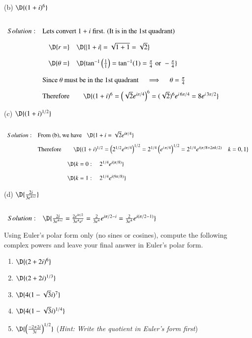 \documentclass[11pt]{article}
\begin{document}
(b) $\D{(1+i)^6}$ 

$
\setlength{\extrarowheight}{0.4cm}
\begin{array}{rrl}
	Solution: & \multicolumn{2}{l}{\text{Lets convert $1+i$ first. (It is in the 1st quadrant)}} \\
	& \D{r =} & \D{\left|1+i\right| = \sqrt{1+1} = \sqrt{2} } \\
	& \D{\theta =} & \D{\tan^{-1}\left(\frac{1}{1}\right) = \tan^{-1}(1) = \frac{\pi}{4} \,\,\text{or}\,\, -\frac{\pi}{4} } \\
	& \multicolumn{2}{l}{\text{Since $\theta$ must be in the 1st quadrant $\quad \implies \quad \theta = \frac{\pi}{4}$ }} \\
	& \text{Therefore} & \quad \D{(1+i)^6 = \left(\sqrt{2}e^{i\pi/4}\right)^6 = (\sqrt{2})^6e^{i\,6\pi/4}= 8e^{i\,3\pi/2}} \\
\end{array}
$

(c) $\D{(1+i)^{1/2}}$ 

$
\setlength{\extrarowheight}{0.4cm}
\begin{array}{rrl}
	Solution: & \multicolumn{2}{l}{\text{From (b), we have \,\, }\D{ 1+i = \sqrt{2}e^{i\pi/4} }} \\
	& \text{Therefore} & \quad \D{(1+i)^{1/2} = \left(2^{1/2}e^{i\pi/4}\right)^{1/2} = 2^{1/4}\left(e^{i\,\pi/4}\right)^{1/2} = 2^{1/4} e^{i(\pi/8+2\pi k/2)} \quad k=0,1} \\
	&& \D{k=0: \quad 2^{1/4}e^{i(\pi/8)}} \\
	&& \D{k=1: \quad 2^{1/4}e^{i(9\pi/8)}} \\
\end{array}
$

(d) $\D{\frac{2i}{3e^{4+i}}}$ 

$
\setlength{\extrarowheight}{0.4cm}
\begin{array}{rrl}
	Solution: & \D{\frac{2i}{3e^{4+i}} = \frac{2e^{i\pi/2}}{3e^4e^{i}} = \frac{2}{3e^4}e^{i\pi/2-i} = \frac{2}{3e^4}e^{i(\pi/2-1)}} \\
\end{array}
$

\newpage
\thispagestyle{empty}


\vspace{0.2cm}

Using Euler's polar form only (no sines or cosines), compute the following complex powers and leave your final answer in Euler's polar form.
\begin{enumerate}
	\item $\D{(2+2i)^6}$
	\item $\D{(2+2i)^{1/3}}$
	\item $\D{4(1-\sqrt{3}i)^7}$
	\item $\D{4(1-\sqrt{3}i)^{1/4}}$
	\item $\D{\left(\frac{-2+2i}{3i}\right)^{1/2}}$ \quad ({\it Hint: Write the quotient in Euler's form first})  
\end{enumerate}
\end{document}
